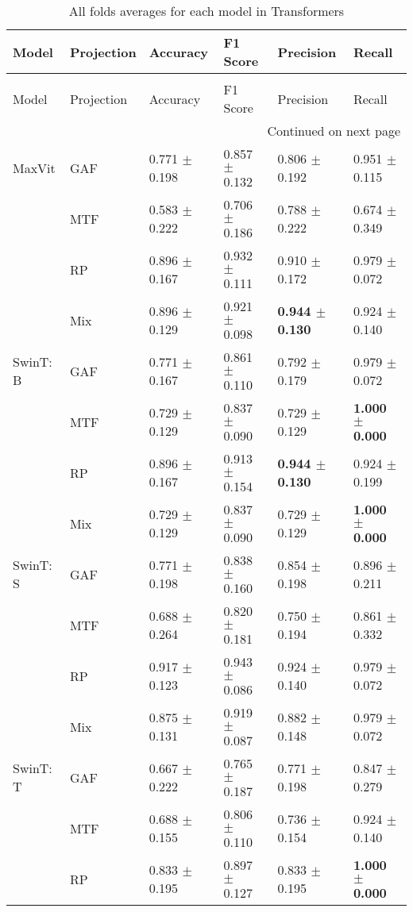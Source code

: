 \begin{longtable}[t]{llllll}
\caption{All folds averages for each model in Transformers} \\
\toprule
Model & Projection & Accuracy & F1 Score & Precision & Recall \\
\midrule
\endfirsthead
\caption[]{All folds averages for each model in Transformers} \\
\toprule
Model & Projection & Accuracy & F1 Score & Precision & Recall \\
\midrule
\endhead
\midrule
\multicolumn{6}{r}{Continued on next page} \\
\midrule
\endfoot
\bottomrule
\endlastfoot
MaxVit & GAF & 0.771 $\pm$ 0.198 & 0.857 $\pm$ 0.132 & 0.806 $\pm$ 0.192 & 0.951 $\pm$ 0.115 \\
 & MTF & 0.583 $\pm$ 0.222 & 0.706 $\pm$ 0.186 & 0.788 $\pm$ 0.222 & 0.674 $\pm$ 0.349 \\
 & RP & 0.896 $\pm$ 0.167 & 0.932 $\pm$ 0.111 & 0.910 $\pm$ 0.172 & 0.979 $\pm$ 0.072 \\
 & Mix & 0.896 $\pm$ 0.129 & 0.921 $\pm$ 0.098 & \textbf{0.944 $\pm$ 0.130} & 0.924 $\pm$ 0.140 \\
SwinT: B & GAF & 0.771 $\pm$ 0.167 & 0.861 $\pm$ 0.110 & 0.792 $\pm$ 0.179 & 0.979 $\pm$ 0.072 \\
 & MTF & 0.729 $\pm$ 0.129 & 0.837 $\pm$ 0.090 & 0.729 $\pm$ 0.129 & \textbf{1.000 $\pm$ 0.000} \\
 & RP & 0.896 $\pm$ 0.167 & 0.913 $\pm$ 0.154 & \textbf{0.944 $\pm$ 0.130} & 0.924 $\pm$ 0.199 \\
 & Mix & 0.729 $\pm$ 0.129 & 0.837 $\pm$ 0.090 & 0.729 $\pm$ 0.129 & \textbf{1.000 $\pm$ 0.000} \\
SwinT: S & GAF & 0.771 $\pm$ 0.198 & 0.838 $\pm$ 0.160 & 0.854 $\pm$ 0.198 & 0.896 $\pm$ 0.211 \\
 & MTF & 0.688 $\pm$ 0.264 & 0.820 $\pm$ 0.181 & 0.750 $\pm$ 0.194 & 0.861 $\pm$ 0.332 \\
 & RP & 0.917 $\pm$ 0.123 & 0.943 $\pm$ 0.086 & 0.924 $\pm$ 0.140 & 0.979 $\pm$ 0.072 \\
 & Mix & 0.875 $\pm$ 0.131 & 0.919 $\pm$ 0.087 & 0.882 $\pm$ 0.148 & 0.979 $\pm$ 0.072 \\
SwinT: T & GAF & 0.667 $\pm$ 0.222 & 0.765 $\pm$ 0.187 & 0.771 $\pm$ 0.198 & 0.847 $\pm$ 0.279 \\
 & MTF & 0.688 $\pm$ 0.155 & 0.806 $\pm$ 0.110 & 0.736 $\pm$ 0.154 & 0.924 $\pm$ 0.140 \\
 & RP & 0.833 $\pm$ 0.195 & 0.897 $\pm$ 0.127 & 0.833 $\pm$ 0.195 & \textbf{1.000 $\pm$ 0.000} \\

\end{longtable}
